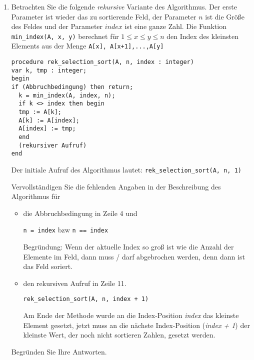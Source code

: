 \documentclass{lehramt-informatik-aufgabe}
\begin{document}
\begin{enumerate}
%

\item Betrachten Sie die folgende \emph{rekursive} Variante des
Algorithmus. Der erste Parameter ist wieder das zu sortierende Feld, der Parameter
$n$ ist die Größe des Feldes und der Parameter $index$ ist eine ganze
Zahl. Die Funktion \texttt{min_index(A, x, y)} berechnet
für $1 \leq x \leq y \leq n$ den Index des kleinsten Elements aus der
Menge \texttt{{A[x], A[x+1],...,A[y]}}

\begin{verbatim}
procedure rek_selection_sort(A, n, index : integer)
var k, tmp : integer;
begin
if (Abbruchbedingung) then return;
  k = min_index(A, index, n);
  if k <> index then begin
  tmp := A[k];
  A[k] := A[index];
  A[index] := tmp;
  end
  (rekursiver Aufruf)
end
\end{verbatim}

Der initiale Aufruf des Algorithmus lautet:
\texttt{rek_selection_sort(A, n, 1)}

Vervollständigen Sie die fehlenden Angaben in der Beschreibung des
Algorithmus für

\begin{itemize}
\item die Abbruchbedingung in Zeile 4 und

\begin{liAntwort}
\texttt{n = index} bzw \texttt{n == index}

Begründung: Wenn der aktuelle Index so groß ist wie die Anzahl der
Elemente im Feld, dann muss / darf abgebrochen werden, denn dann ist das
Feld soriert.
\end{liAntwort}

\item den rekursiven Aufruf in Zeile 11.

\begin{liAntwort}
\texttt{rek_selection_sort(A, n, index + 1)}

Am Ende der Methode wurde an die Index-Position \emph{index} das
kleinste Element gesetzt, jetzt muss an die nächste Index-Position
(\emph{index + 1}) der kleinste Wert, der noch nicht sortieren Zahlen,
gesetzt werden.
\end{liAntwort}
\end{itemize}

Begründen Sie Ihre Antworten.
\end{enumerate}

\end{document}
